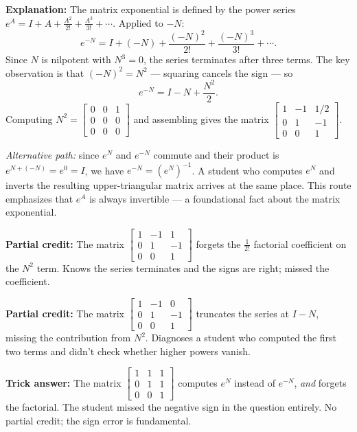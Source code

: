 \documentclass[12pt]{amsart}
\begin{document}
\textbf{Explanation:}
The matrix exponential is defined by the power series
$e^A = I + A + \frac{A^2}{2!} + \frac{A^3}{3!} + \cdots$. Applied to $-N$:
$$e^{-N} = I + (-N) + \frac{(-N)^2}{2!} + \frac{(-N)^3}{3!} + \cdots.$$
Since $N$ is nilpotent with $N^3 = 0$, the series terminates after three
terms. The key observation is that $(-N)^2 = N^2$ --- squaring cancels
the sign --- so
$$e^{-N} = I - N + \frac{N^2}{2}.$$
Computing $N^2 = \begin{bmatrix} 0 & 0 & 1 \\ 0 & 0 & 0 \\ 0 & 0 & 0 \end{bmatrix}$
and assembling gives the matrix $\begin{bmatrix} 1 & -1 & 1/2 \\ 0 & 1 & -1 \\ 0 & 0 & 1 \end{bmatrix}$.

\emph{Alternative path:} since $e^N$ and $e^{-N}$ commute and their product
is $e^{N + (-N)} = e^0 = I$, we have $e^{-N} = (e^N)^{-1}$. A student who
computes $e^N$ and inverts the resulting upper-triangular matrix arrives
at the same place. This route emphasizes that $e^A$ is always invertible
--- a foundational fact about the matrix exponential.

\textbf{Partial credit:}
The matrix $\begin{bmatrix} 1 & -1 & 1 \\ 0 & 1 & -1 \\ 0 & 0 & 1 \end{bmatrix}$
forgets the $\frac{1}{2!}$ factorial coefficient on the $N^2$ term. Knows
the series terminates and the signs are right; missed the coefficient.

\textbf{Partial credit:}
The matrix $\begin{bmatrix} 1 & -1 & 0 \\ 0 & 1 & -1 \\ 0 & 0 & 1 \end{bmatrix}$
truncates the series at $I - N$, missing the contribution from $N^2$.
Diagnoses a student who computed the first two terms and didn't check
whether higher powers vanish.

\textbf{Trick answer:}
The matrix $\begin{bmatrix} 1 & 1 & 1 \\ 0 & 1 & 1 \\ 0 & 0 & 1 \end{bmatrix}$
computes $e^{N}$ instead of $e^{-N}$, \emph{and} forgets the factorial.
The student missed the negative sign in the question entirely. No partial
credit; the sign error is fundamental.
\end{document}

